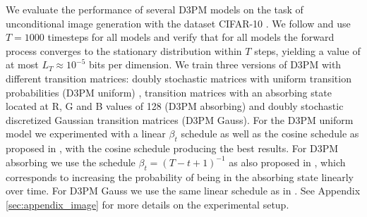 We evaluate the performance of several D3PM models on the task of unconditional image generation with the dataset CIFAR-10 \citep{krizhevsky2009learning}. We follow \citet{ho2020denoising} and use $T=1000$ timesteps for all models and verify that for all models the forward process converges to the stationary distribution within $T$ steps, yielding a value of at most $L_T\approx 10^{-5}$ bits per dimension. We train three versions of D3PM with different transition matrices: doubly stochastic matrices with uniform transition probabilities (D3PM uniform) \citep{hoogeboom2021argmax}, transition matrices with an absorbing state located at R, G and B values of 128 (D3PM absorbing) and doubly stochastic discretized Gaussian transition matrices (D3PM Gauss). For the D3PM uniform model we experimented with a linear $\beta_t$ schedule as well as the cosine schedule as proposed in \citep{hoogeboom2021argmax}, with the cosine schedule producing the best results. For D3PM absorbing we use the schedule $\beta_t = (T-t+1)^{-1}$ as also proposed in \citep{sohl2015deep}, which corresponds to increasing the probability of being in the absorbing state linearly over time.
For D3PM Gauss we use the same linear schedule as in \citep{ho2020denoising}. See Appendix \ref{sec:appendix_image} for more details on the experimental setup.


